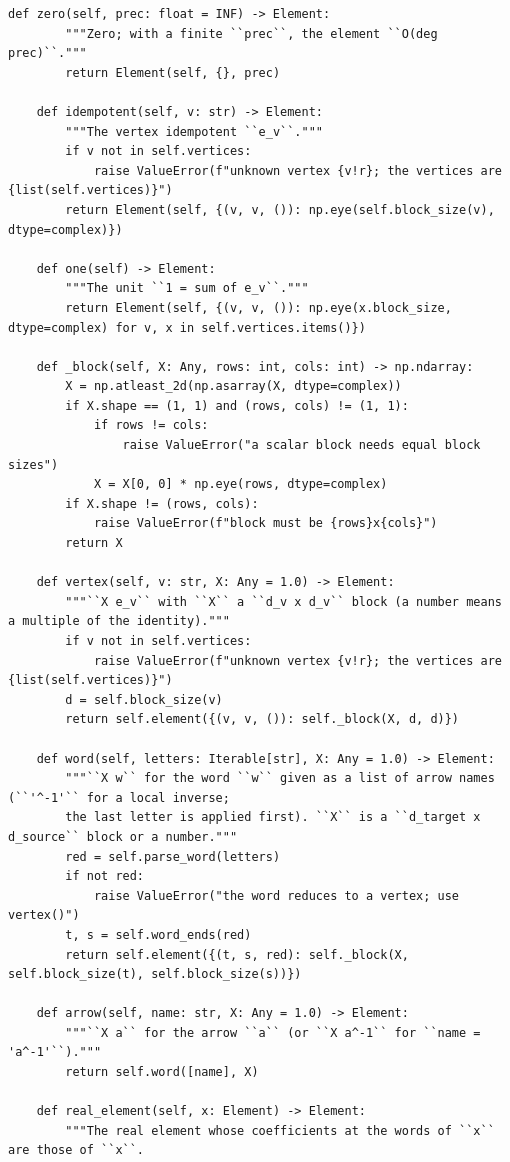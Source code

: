 \documentclass[12pt, a4paper]{report}
\theoremstyle{plain}
\theoremstyle{definition}
\theoremstyle{remark}
\theoremstyle{plain}
\begin{document}
\begin{lstlisting}[style=dsqcode]
    def zero(self, prec: float = INF) -> Element:
        """Zero; with a finite ``prec``, the element ``O(deg prec)``."""
        return Element(self, {}, prec)

    def idempotent(self, v: str) -> Element:
        """The vertex idempotent ``e_v``."""
        if v not in self.vertices:
            raise ValueError(f"unknown vertex {v!r}; the vertices are {list(self.vertices)}")
        return Element(self, {(v, v, ()): np.eye(self.block_size(v), dtype=complex)})

    def one(self) -> Element:
        """The unit ``1 = sum of e_v``."""
        return Element(self, {(v, v, ()): np.eye(x.block_size, dtype=complex) for v, x in self.vertices.items()})

    def _block(self, X: Any, rows: int, cols: int) -> np.ndarray:
        X = np.atleast_2d(np.asarray(X, dtype=complex))
        if X.shape == (1, 1) and (rows, cols) != (1, 1):
            if rows != cols:
                raise ValueError("a scalar block needs equal block sizes")
            X = X[0, 0] * np.eye(rows, dtype=complex)
        if X.shape != (rows, cols):
            raise ValueError(f"block must be {rows}x{cols}")
        return X

    def vertex(self, v: str, X: Any = 1.0) -> Element:
        """``X e_v`` with ``X`` a ``d_v x d_v`` block (a number means a multiple of the identity)."""
        if v not in self.vertices:
            raise ValueError(f"unknown vertex {v!r}; the vertices are {list(self.vertices)}")
        d = self.block_size(v)
        return self.element({(v, v, ()): self._block(X, d, d)})

    def word(self, letters: Iterable[str], X: Any = 1.0) -> Element:
        """``X w`` for the word ``w`` given as a list of arrow names (``'^-1'`` for a local inverse;
        the last letter is applied first). ``X`` is a ``d_target x d_source`` block or a number."""
        red = self.parse_word(letters)
        if not red:
            raise ValueError("the word reduces to a vertex; use vertex()")
        t, s = self.word_ends(red)
        return self.element({(t, s, red): self._block(X, self.block_size(t), self.block_size(s))})

    def arrow(self, name: str, X: Any = 1.0) -> Element:
        """``X a`` for the arrow ``a`` (or ``X a^-1`` for ``name = 'a^-1'``)."""
        return self.word([name], X)

    def real_element(self, x: Element) -> Element:
        """The real element whose coefficients at the words of ``x`` are those of ``x``.


\end{lstlisting}
\end{document}
